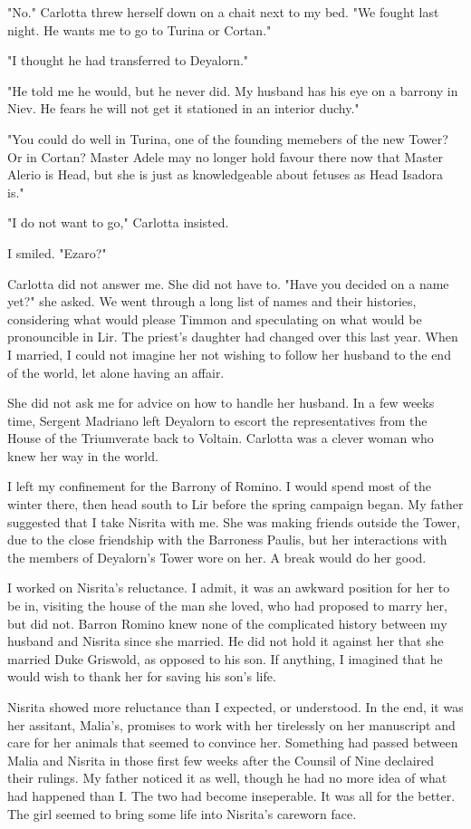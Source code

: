 \documentclass{article}
\begin{document}
"No." Carlotta threw herself down on a chait next to my bed. "We fought last night. He wants me to go to Turina or Cortan."

"I thought he had transferred to Deyalorn." 

"He told me he would, but he never did. My husband has his eye on a barrony in Niev. He fears he will not get it stationed in an interior duchy."

"You could do well in Turina, one of the founding memebers of the new Tower? Or in Cortan? Master Adele may no longer hold favour there now that Master Alerio is Head, but she is just as knowledgeable about fetuses as Head Isadora is."

"I do not want to go," Carlotta insisted.

I smiled. "Ezaro?"

Carlotta did not answer me. She did not have to. "Have you decided on a name yet?" she asked. We went through a long list of names and their histories, considering what would please Timmon and speculating on what would be pronouncible in Lir. The priest's daughter had changed over this last year. When I married, I could not imagine her not wishing to follow her husband to the end of the world, let alone having an affair.

She did not ask me for advice on how to handle her husband. In a few weeks time, Sergent Madriano left Deyalorn to escort the representatives from the House of the Triumverate back to Voltain.  Carlotta was a clever woman who knew her way in the world.

I left my confinement for the Barrony of Romino. I would spend most of the winter there, then head south to Lir before the spring campaign began. My father suggested that I take Nisrita with me. She was making friends outside the Tower, due to the close friendship with the Barroness Paulis, but her interactions with the members of Deyalorn's Tower wore on her. A break would do her good. 

I worked on Nisrita's reluctance. I admit, it was an awkward position for her to be in, visiting the house of the man she loved, who had proposed to marry her, but did not. Barron Romino knew none of the complicated history between my husband and Nisrita since she married. He did not hold it against her that she married Duke Griswold, as opposed to his son. If anything, I imagined that he would wish to thank her for saving his son's life. 

Nisrita showed more reluctance than I expected, or understood. In the end, it was her assitant, Malia's, promises to work with her tirelessly on her manuscript and care for her animals that seemed to convince her. Something had passed between Malia and Nisrita in those first few weeks after the Counsil of Nine declaired their rulings. My father noticed it as well, though he had no more idea of what had happened than I. The two had become inseperable. It was all for the better. The girl seemed to bring some life into Nisrita's careworn face. 
\end{document}
